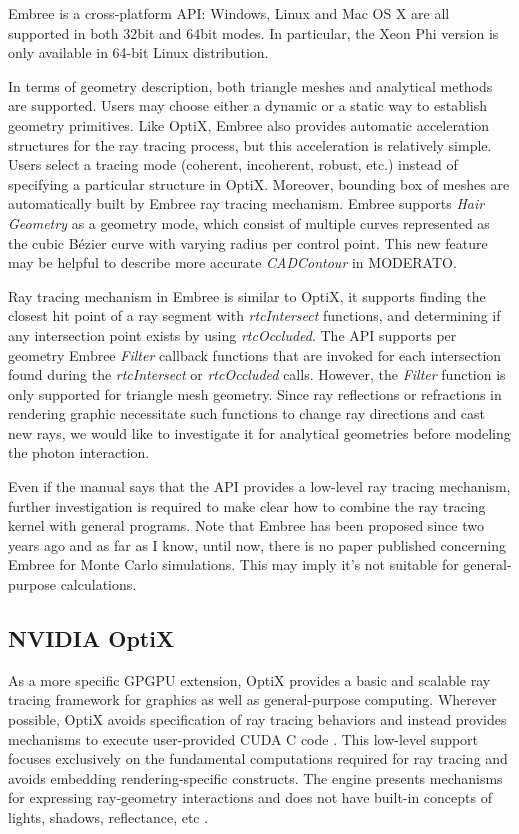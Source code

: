 Embree is a cross-platform API: Windows, Linux and Mac OS X are all supported in both 32bit and 64bit modes. In particular, the Xeon Phi version is only available in 64-bit Linux distribution.

In terms of geometry description, both triangle meshes and analytical methods are supported. Users may choose either a dynamic or a static way to establish geometry primitives. Like OptiX, Embree also provides automatic acceleration structures for the ray tracing process, but this acceleration is relatively simple. Users select a tracing mode (coherent, incoherent, robust, etc.) instead of specifying a particular structure in OptiX. Moreover, bounding box of meshes are automatically built by Embree ray tracing mechanism. Embree supports \textit{Hair Geometry} as a geometry mode, which consist of multiple curves represented as the cubic Bézier curve with varying radius per control point. This new feature may be helpful to describe more accurate \textit{CADContour} in MODERATO.

Ray tracing mechanism in Embree is similar to OptiX, it supports finding the closest hit point of a ray segment with \textit{rtcIntersect} functions, and determining if any intersection point exists by using \textit{rtcOccluded}. The API supports per geometry Embree \textit{Filter} callback functions that are invoked for each intersection found during the \textit{rtcIntersect} or \textit{rtcOccluded} calls. However, the \textit{Filter} function is only supported for triangle mesh geometry. Since ray reflections or refractions in rendering graphic necessitate such functions to change ray directions and cast new rays, we would like to investigate it for analytical geometries before modeling the photon interaction.

Even if the manual says that the API provides a low-level ray tracing mechanism, further investigation is required to make clear how to combine the ray tracing kernel with general programs. Note that Embree has been proposed since two years ago and as far as I know, until now, there is no paper published concerning Embree for Monte Carlo simulations. This may imply it's not suitable for general-purpose calculations. 

\subsection{NVIDIA OptiX}
As a more specific GPGPU extension, OptiX provides a basic and scalable ray tracing framework for graphics as well as general-purpose computing. Wherever possible, OptiX avoids specification of ray tracing behaviors and instead provides mechanisms to execute user-provided CUDA C code \citep{Reference6}. This low-level support focuses exclusively on the fundamental computations required for ray tracing and avoids embedding rendering-specific constructs. The engine presents mechanisms for expressing ray-geometry interactions and does not have built-in concepts of lights, shadows, reflectance, etc \citep{Parker10OptiX}. 

